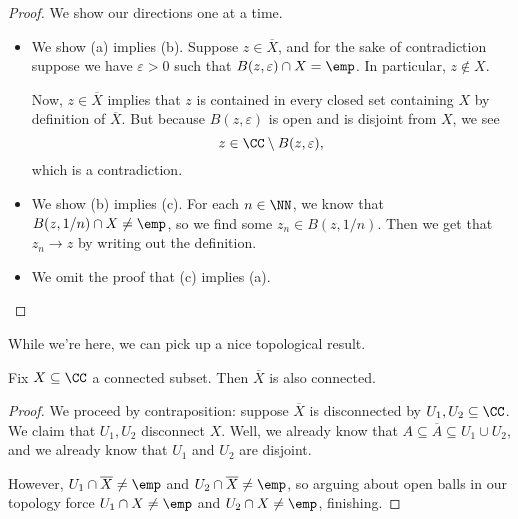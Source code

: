 \begin{proof}
	We show our directions one at a time.
	\begin{itemize}
		\item We show (a) implies (b). Suppose $z\in\overline X$, and for the sake of contradiction suppose we have $\varepsilon>0$ such that $B(z,\varepsilon)\cap X=\emp$. In particular, $z\notin X$.

		Now, $z\in\overline X$ implies that $z$ is contained in every closed set containing $X$ by definition of $\overline X$. But because $B(z,\varepsilon)$ is open and is disjoint from $X$, we see
		\[z\in\CC\setminus B(z,\varepsilon),\]
		which is a contradiction.
		\item We show (b) implies (c). For each $n\in\NN$, we know that $B(z,1/n)\cap X\ne\emp$, so we find some $z_n\in B(z,1/n)$. Then we get that $z_n\to z$ by writing out the definition.

		\item We omit the proof that (c) implies (a).\todo{}
		\qedhere
	\end{itemize}
\end{proof}

While we're here, we can pick up a nice topological result.
\begin{lemma}
	Fix $X\subseteq\CC$ a connected subset. Then $\overline X$ is also connected.
\end{lemma}
\begin{proof}
	We proceed by contraposition: suppose $\overline X$ is disconnected by $U_1,U_2\subseteq\CC$. We claim that $U_1,U_2$ disconnect $X$. Well, we already know that $A\subseteq\overline A\subseteq U_1\cup U_2$, and we already know that $U_1$ and $U_2$ are disjoint.

	However, $U_1\cap\overline X\ne\emp$ and $U_2\cap\overline X\ne\emp$, so arguing about open balls in our topology force $U_1\cap X\ne\emp$ and $U_2\cap X\ne\emp$, finishing.
\end{proof}

